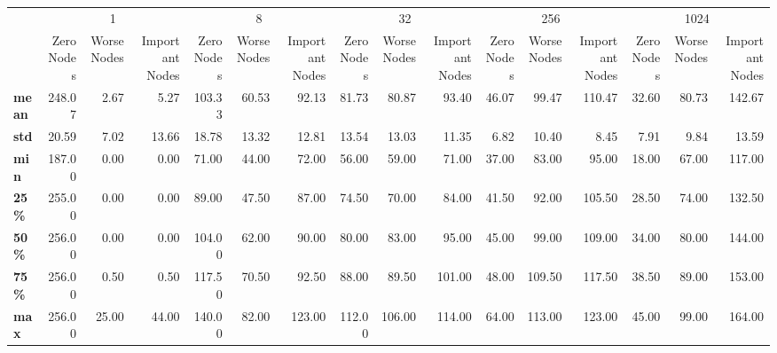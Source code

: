 \begin{tabular}{lrrrrrrrrrrrrrrr}
\toprule
{} & \multicolumn{3}{c}{1} & \multicolumn{3}{c}{8} & \multicolumn{3}{c}{32} & \multicolumn{3}{c}{256} & \multicolumn{3}{c}{1024} \\
{} & Zero Nodes & Worse Nodes & Important Nodes & Zero Nodes & Worse Nodes & Important Nodes & Zero Nodes & Worse Nodes & Important Nodes & Zero Nodes & Worse Nodes & Important Nodes & Zero Nodes & Worse Nodes & Important Nodes \\
\midrule
\textbf{mean} &     248.07 &        2.67 &            5.27 &     103.33 &       60.53 &           92.13 &      81.73 &       80.87 &           93.40 &      46.07 &       99.47 &          110.47 &      32.60 &       80.73 &          142.67 \\
\textbf{std } &      20.59 &        7.02 &           13.66 &      18.78 &       13.32 &           12.81 &      13.54 &       13.03 &           11.35 &       6.82 &       10.40 &            8.45 &       7.91 &        9.84 &           13.59 \\
\textbf{min } &     187.00 &        0.00 &            0.00 &      71.00 &       44.00 &           72.00 &      56.00 &       59.00 &           71.00 &      37.00 &       83.00 &           95.00 &      18.00 &       67.00 &          117.00 \\
\textbf{25\% } &     255.00 &        0.00 &            0.00 &      89.00 &       47.50 &           87.00 &      74.50 &       70.00 &           84.00 &      41.50 &       92.00 &          105.50 &      28.50 &       74.00 &          132.50 \\
\textbf{50\% } &     256.00 &        0.00 &            0.00 &     104.00 &       62.00 &           90.00 &      80.00 &       83.00 &           95.00 &      45.00 &       99.00 &          109.00 &      34.00 &       80.00 &          144.00 \\
\textbf{75\% } &     256.00 &        0.50 &            0.50 &     117.50 &       70.50 &           92.50 &      88.00 &       89.50 &          101.00 &      48.00 &      109.50 &          117.50 &      38.50 &       89.00 &          153.00 \\
\textbf{max } &     256.00 &       25.00 &           44.00 &     140.00 &       82.00 &          123.00 &     112.00 &      106.00 &          114.00 &      64.00 &      113.00 &          123.00 &      45.00 &       99.00 &          164.00 \\
\bottomrule
\end{tabular}
